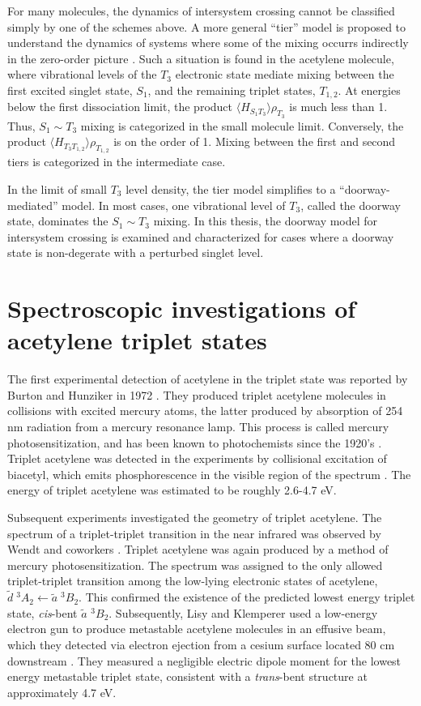 \documentclass[12pt]{mitthesis}
\begin{document}
For many molecules, the dynamics of intersystem crossing cannot be
classified simply by one of the schemes above.  A more general
``tier'' model is proposed to understand the dynamics of systems where
some of the mixing occurrs indirectly in the zero-order picture
\cite{stuchebrukhov93a, stuchebrukhov93b}.  Such a situation is found
in the acetylene molecule, where vibrational levels of the $T_3$
electronic state mediate mixing between the first excited singlet
state, $S_1$, and the remaining triplet states, $T_{1,2}$.  At
energies below the first dissociation limit, the product $\langle
H_{S_1 T_3} \rangle \rho_{T_3}$ is much less than 1.  Thus, $S_1 \sim
T_3$ mixing is categorized in the small molecule limit.  Conversely,
the product $\langle H_{T_3 T_{1,2}} \rangle \rho_{T_{1,2}}$ is on the
order of 1.  Mixing between the first and second tiers is categorized
in the intermediate case.

In the limit of small $T_3$ level density, the tier model simplifies
to a ``doorway-mediated'' model.  In most cases, one vibrational level
of $T_3$, called the doorway state, dominates the $S_1 \sim T_3$
mixing.  In this thesis, the doorway model for intersystem crossing is
examined and characterized for cases where a doorway state is
non-degerate with a perturbed singlet level.

\section{Spectroscopic investigations of acetylene triplet states}

The first experimental detection of acetylene in the triplet state was
reported by Burton and Hunziker in 1972 \cite{burton72}.  They
produced triplet acetylene molecules in collisions with excited mercury
atoms, the latter produced by absorption of 254 nm radiation from a
mercury resonance lamp.  This process is called mercury
photosensitization, and has been known to photochemists since the
1920's \cite{calvert66, cairo22}.  Triplet acetylene was detected in
the experiments by collisional excitation of biacetyl, which emits
phosphorescence in the visible region of the spectrum \cite{burton72}.
The energy of triplet acetylene was estimated to be roughly 2.6-4.7
eV.

Subsequent experiments investigated the geometry of triplet acetylene.
The spectrum of a triplet-triplet transition in the near
infrared was observed by Wendt and coworkers \cite{wendt79}.  Triplet
acetylene was again produced by a method of mercury
photosensitization.  The spectrum was assigned to the only allowed
triplet-triplet transition among the low-lying electronic states of
acetylene, $\tilde{d} \; ^3A_2 \leftarrow \tilde{a} \; ^3B_2$.  This
confirmed the existence of the predicted lowest energy triplet state,
\emph{cis}-bent $\tilde{a}$ $^3B_2$.  Subsequently, Lisy and Klemperer
used a low-energy electron gun to produce metastable acetylene
molecules in an effusive beam, which they detected via electron
ejection from a cesium surface located 80 cm downstream \cite{lisy80,
  hemminger76}.  They measured a negligible electric dipole moment for
the lowest energy metastable triplet state, consistent with a
\emph{trans}-bent structure at approximately 4.7 eV.
\end{document}
